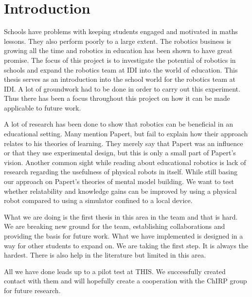 \chapter{Introduction}
Schools have problems with keeping students engaged and motivated in maths lessons. They also perform poorly to a large extent. The robotics business is growing all the time and robotics in education has been shown to have great promise. The focus of this project is to investigate the potential of robotics in schools and expand the robotics team at IDI into the world of education. This thesis serves as an introduction into the school world for the robotics team at IDI. A lot of groundwork had to be done in order to carry out this experiment. Thus there has been a focus throughout this project on how it can be made applicable to future work.

\bigskip\noindent
A lot of research has been done to show that robotics can be beneficial in an educational setting. 
Many mention Papert, but fail to explain how their approach relates to his theories of learning.
They merely say that Papert was an influence or that they use experimental design, but this is only a small part of Papert's vision. 
Another common sight while reading about educational robotics is lack of research regarding the usefulness of physical robots in itself. 
While still basing our approach on Papert's theories of mental model building. We want to test whether relatability and knowledge gains can be improved by using a physical robot compared to using a simulator confined to a local device.

\bigskip\noindent
What we are doing is the first thesis in this area in the team and that is hard. We are breaking new ground for the team, establishing collaborations and providing the basis for future work. What we have implemented is designed in a way for other students to expand on. We are taking the first step. It is always the hardest. There is also help in the literature but limited in this area. 

All we have done leads up to a pilot test at THIS. We successfully created contact with them and will hopefully create a cooperation with the ChIRP group for future research. 





